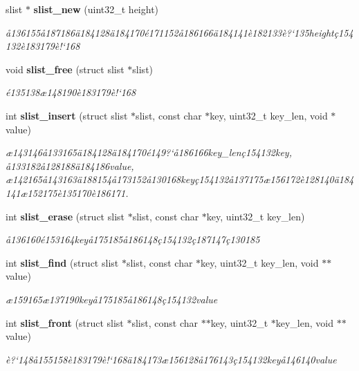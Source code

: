 \begin{CompactItemize}
\item 
slist $\ast$ {\bf slist\_\-new} (uint32\_\-t height)
\begin{CompactList}\small\item\em \aa{}136155\aa{}187186\"{a}184128\"{a}184170\'{e}171152\aa{}186166\"{a}184141\`{e}182133\`{e}?`135height\c{c}154132\`{e}183179\`{e}!`168 \item\end{CompactList}\item 
void {\bf slist\_\-free} (struct slist $\ast$slist)
\begin{CompactList}\small\item\em \'{e}135138\ae{}148190\`{e}183179\`{e}!`168 \item\end{CompactList}\item 
int {\bf slist\_\-insert} (struct slist $\ast$slist, const char $\ast$key, uint32\_\-t key\_\-len, void $\ast$value)
\begin{CompactList}\small\item\em \ae{}143146\aa{}133165\"{a}184128\"{a}184170\'{e}149?`\aa{}186166key\_\-len\c{c}154132key, \aa{}133182\aa{}128188\"{a}184186value, \ae{}142165\aa{}143163\"{a}188154\aa{}173152\aa{}130168key\c{c}154132\aa{}137175\ae{}156172\`{e}128140\"{a}184141\ae{}152175\`{e}135170\`{e}186171. \item\end{CompactList}\item 
int {\bf slist\_\-erase} (struct slist $\ast$slist, const char $\ast$key, uint32\_\-t key\_\-len)
\begin{CompactList}\small\item\em \aa{}136160\'{e}153164key\aa{}175185\aa{}186148\c{c}154132\c{c}187147\c{c}130185 \item\end{CompactList}\item 
int {\bf slist\_\-find} (struct slist $\ast$slist, const char $\ast$key, uint32\_\-t key\_\-len, void $\ast$$\ast$value)
\begin{CompactList}\small\item\em \ae{}159165\ae{}137190key\aa{}175185\aa{}186148\c{c}154132value \item\end{CompactList}\item 
int {\bf slist\_\-front} (struct slist $\ast$slist, const char $\ast$$\ast$key, uint32\_\-t $\ast$key\_\-len, void $\ast$$\ast$value)
\begin{CompactList}\small\item\em \`{e}?`148\aa{}155158\`{e}183179\`{e}!`168\"{a}184173\ae{}156128\aa{}176143\c{c}154132key\aa{}146140value \item\end{CompactList}\item 
$$
\end{CompactItemize}
